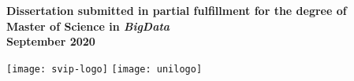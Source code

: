 \begin{titlepage}
		
		\begin{center}\bf
		    Dissertation submitted in partial fulfillment for the degree of \\
		    Master of Science in \textit{BigData} \\[1em]  
		\hfill \break
		    \large September 2020\\
	   \end{center} 	
		
		
		
		\vfill
		\texttt{[image: svip-logo]} 
		\hfill
		\texttt{[image: unilogo]}
		
		
		\vfill %
		
	\end{titlepage}